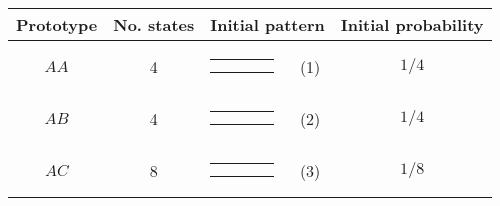 \begin{center}
\begin{tabular}{ccrlc} \hline
Prototype & No. states & \multicolumn{2}{c}{Initial pattern} & Initial probability \\ \hline
$AA$ & 4 & 
{\renewcommand{\arraystretch}{0.3}
\renewcommand{\tabcolsep}{0.5mm}
\parbox[b][3mm][c]{12mm}{
\begin{tabular}{|p{2mm}|p{2mm}||p{2mm}|p{2mm}|} \hline
$\bullet$ &           &           &           \\
$\bullet$ &           &           &           \\ \hline
\end{tabular}}}
& (1) & $1/4$ \\
$AB$ & 4 & 
{\renewcommand{\arraystretch}{0.3}
\renewcommand{\tabcolsep}{0.5mm}
\parbox[b][3mm][c]{12mm}{
\begin{tabular}{|p{2mm}|p{2mm}||p{2mm}|p{2mm}|} \hline
$\bullet$ &           &           &           \\
          & $\bullet$ &           &           \\ \hline
\end{tabular}}}
& (2) & $1/4$ \\
$AC$ & 8 & 
{\renewcommand{\arraystretch}{0.3}
\renewcommand{\tabcolsep}{0.5mm}
\parbox[b][3mm][c]{12mm}{
\begin{tabular}{|p{2mm}|p{2mm}||p{2mm}|p{2mm}|} \hline
$\bullet$ &           &           &           \\
          &           & $\bullet$ &           \\ \hline
\end{tabular}}}
& (3) & $1/8$ \\
\hline
\end{tabular}
\end{center}

